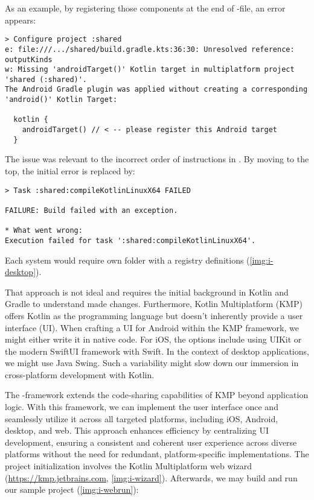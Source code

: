 As an example, by registering those components at the end of -file, an error appears:

\begin{lstlisting}[language=terminal]
> Configure project :shared
e: file:///.../shared/build.gradle.kts:36:30: Unresolved reference: outputKinds
w: Missing 'androidTarget()' Kotlin target in multiplatform project 'shared (:shared)'.
The Android Gradle plugin was applied without creating a corresponding 'android()' Kotlin Target:

  kotlin {
    androidTarget() // < -- please register this Android target
  }
\end{lstlisting}

\noindent The issue was relevant to the incorrect order of instructions in . By moving 
 to the top, the initial error is replaced by:

\begin{lstlisting}[language=terminal]
> Task :shared:compileKotlinLinuxX64 FAILED

FAILURE: Build failed with an exception.

* What went wrong:
Execution failed for task ':shared:compileKotlinLinuxX64'.
\end{lstlisting}

\noindent Each system would require own folder with a registry definitions \cite{Resa22} (\cref{img:i-desktop}).


\noindent That approach is not ideal and requires the initial background in Kotlin and Gradle to understand made changes. 
Furthermore, Kotlin Multiplatform (KMP) offers Kotlin as the programming language but doesn't inherently provide a user 
interface (UI). When crafting a UI for Android within the KMP framework, we might either write it in native code. For 
iOS, the options include using UIKit or the modern SwiftUI framework with Swift. In the context of desktop applications, 
we might use Java Swing. Such a variability might slow down our immersion in cross-platform development with Kotlin.


\noindent The -framework \cite{JetB23} extends the code-sharing capabilities of KMP beyond 
application logic. With this framework, we can implement the user interface once and seamlessly utilize it across all 
targeted platforms, including iOS, Android, desktop, and web. This approach enhances efficiency by centralizing UI 
development, ensuring a consistent and coherent user experience across diverse platforms without the need for redundant, 
platform-specific implementations. The project initialization involves the Kotlin Multiplatform web wizard
(\href{https://kmp.jetbrains.com}{https://kmp.jetbrains.com}, \cref{img:i-wizard}). Afterwards, we may build and run 
our sample project (\cref{img:i-webrun}):


